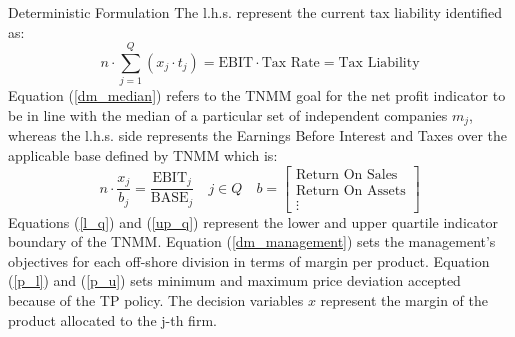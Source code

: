 \documentclass[10pt]{beamer}
\begin{document}
\begin{frame}[allowframebreaks]{Deterministic Formulation}
The l.h.s. represent the current tax liability identified as:
  $$
  n\cdot \sum^{Q}_{j=1}(x_j\cdot t_j)  = \text{EBIT} \cdot \text{Tax Rate} = \text {Tax Liability} 
  $$
  Equation (\ref{dm_median}) refers to the TNMM goal for the net profit indicator to be in line with the median of a particular set of independent companies $m_j$, whereas the l.h.s. side represents the Earnings Before Interest and Taxes over the applicable base defined by TNMM which is:
  $$
  n\cdot \frac{x_j}{b_j} = \frac{\text{EBIT}_j}{\text{BASE}_j} \quad j \in Q \quad b = \begin{bmatrix} \text{Return On Sales} \\ \text{Return On Assets} \\ \vdots \end{bmatrix}
  $$
  Equations (\ref{l_q}) and (\ref{up_q}) represent the lower and upper quartile indicator boundary of the TNMM. Equation (\ref{dm_management}) sets the management's objectives for each off-shore division in terms of margin per product. Equation (\ref{p_l}) and (\ref{p_u}) sets minimum and maximum price deviation accepted because of the TP policy. The decision variables \(x\) represent the margin of the product allocated to the j-th firm.

\end{frame}
\end{document}
